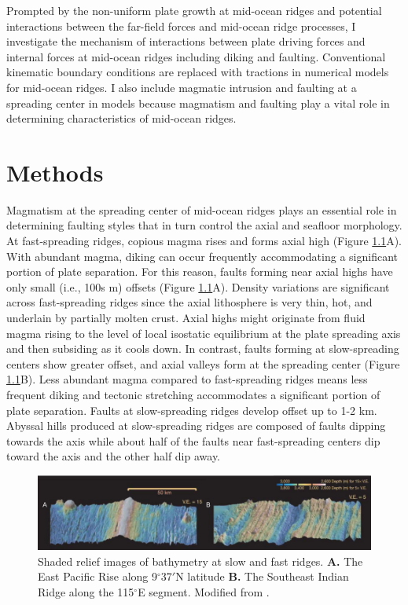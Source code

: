 \documentclass[letterpaper,12pt,notitle]{memphisthesis}                     %
\begin{document}
Prompted by the non-uniform plate growth at mid-ocean ridges and potential interactions between the far-field forces and mid-ocean ridge processes, I investigate the mechanism of interactions between plate driving forces and internal forces at mid-ocean ridges including diking and faulting. Conventional kinematic boundary conditions are replaced with tractions in numerical models for mid-ocean ridges. I also include magmatic intrusion and faulting at a spreading center in models because magmatism and faulting play a vital role in determining characteristics of mid-ocean ridges. 

\chapter{Methods}

Magmatism at the spreading center of mid-ocean ridges plays an essential role in determining faulting styles that in turn control the axial and seafloor morphology. At fast-spreading ridges, copious magma rises and forms axial high (Figure \ref{fig:ridgebathymetry}A). With abundant magma, diking can occur frequently accommodating a significant portion of plate separation. For this reason, faults forming near axial highs have only small (i.e., 100s m) offsets (Figure \ref{fig:ridgebathymetry}A). Density variations are significant across fast-spreading ridges since the axial lithosphere is very thin, hot, and underlain by partially molten crust. Axial highs might originate from fluid magma rising to the level of local isostatic equilibrium at the plate spreading axis and then subsiding as it cools down. In contrast, faults forming at slow-spreading centers show greater offset, and axial valleys form at the spreading center (Figure \ref{fig:ridgebathymetry}B). Less abundant magma compared to fast-spreading ridges means less frequent diking and tectonic stretching accommodates a significant portion of plate separation. Faults at slow-spreading ridges develop offset up to 1-2 km. Abyssal hills produced at slow-spreading ridges are composed of faults dipping towards the axis while about half of the faults near fast-spreading centers dip toward the axis and the other half dip away.

\begin{figure}[!htb]
	\centering
	\includegraphics[width=0.99\linewidth]{./figs/bathy_buck.png}
	\caption{Shaded relief images of bathymetry at slow and fast ridges. \textbf{A.} The East Pacific Rise along 9$^\circ$37$'$N latitude \textbf{B.} The Southeast Indian Ridge along the 115$^\circ$E segment. Modified from \citet{Buck2005}.}
	\label{fig:ridgebathymetry}
\end{figure}
\end{document}

